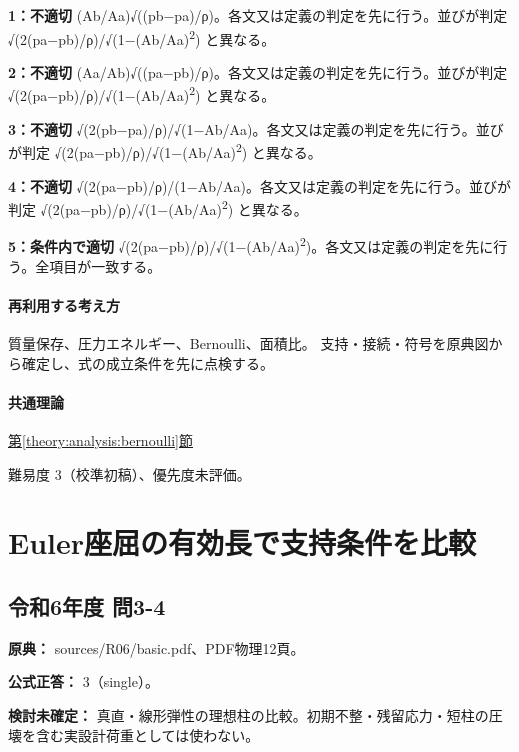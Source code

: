 \noindent\textbf{1：不適切} (Ab/Aa)√((pb−pa)/ρ)。各文又は定義の判定を先に行う。並びが判定 √(2(pa−pb)/ρ)/√(1−(Ab/Aa)\textsuperscript{2}) と異なる。\par

\noindent\textbf{2：不適切} (Aa/Ab)√((pa−pb)/ρ)。各文又は定義の判定を先に行う。並びが判定 √(2(pa−pb)/ρ)/√(1−(Ab/Aa)\textsuperscript{2}) と異なる。\par

\noindent\textbf{3：不適切} √(2(pb−pa)/ρ)/√(1−Ab/Aa)。各文又は定義の判定を先に行う。並びが判定 √(2(pa−pb)/ρ)/√(1−(Ab/Aa)\textsuperscript{2}) と異なる。\par

\noindent\textbf{4：不適切} √(2(pa−pb)/ρ)/(1−Ab/Aa)。各文又は定義の判定を先に行う。並びが判定 √(2(pa−pb)/ρ)/√(1−(Ab/Aa)\textsuperscript{2}) と異なる。\par

\noindent\textbf{5：条件内で適切} √(2(pa−pb)/ρ)/√(1−(Ab/Aa)\textsuperscript{2})。各文又は定義の判定を先に行う。全項目が一致する。\par

\paragraph{再利用する考え方} 質量保存、圧力エネルギー、Bernoulli、面積比。 支持・接続・符号を原典図から確定し、式の成立条件を先に点検する。

\paragraph{共通理論} \hyperref[theory:analysis:bernoulli]{第\ref*{theory:analysis:bernoulli}節}

\par 難易度 3（校準初稿）、優先度未評価。

\section{Euler座屈の有効長で支持条件を比較}

\subsection{令和6年度 問3-4}
\label{q:r06-reg-basic-3-4}

\noindent\textbf{原典：} sources/R06/basic.pdf、PDF物理12頁。

\textbf{公式正答：} 3（single）。

\par\textbf{検討未確定：} 真直・線形弾性の理想柱の比較。初期不整・残留応力・短柱の圧壊を含む実設計荷重としては使わない。

